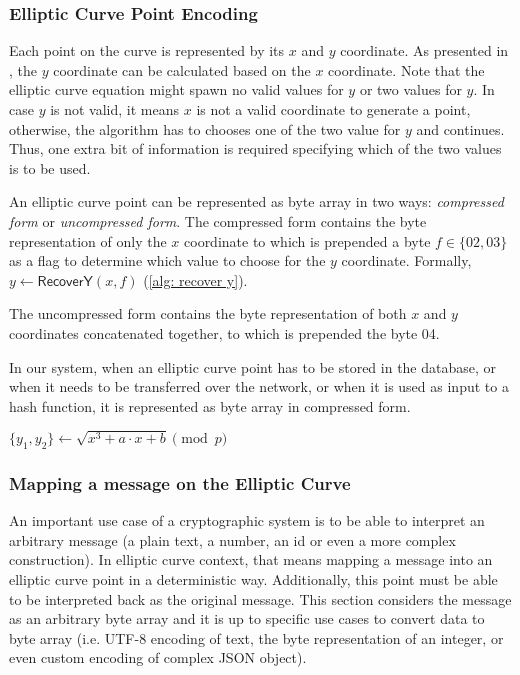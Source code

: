 \subsubsection{Elliptic Curve Point Encoding}
Each point on the curve is represented by its $x$ and $y$ coordinate. As presented in \cite{Trappe05}, the $y$ coordinate can be calculated based on the $x$ coordinate. Note that the elliptic curve equation might spawn no valid values for $y$ or two values for $y$. In case $y$ is not valid, it means $x$ is not a valid coordinate to generate a point, otherwise, the algorithm has to chooses one of the two value for $y$ and continues. Thus, one extra bit of information is required specifying which of the two values is to be used.

An elliptic curve point can be represented as byte array in two ways: \textit{compressed form} or \textit{uncompressed form}. The compressed form contains the byte representation of only the $x$ coordinate to which is prepended a byte $f \in \{ 02, 03 \}$ as a flag to determine which value to choose for the $y$ coordinate. Formally, $y \gets \mathsf{RecoverY}(x, f)$ (\cref{alg: recover y}).

The uncompressed form contains the byte representation of both $x$ and $y$ coordinates concatenated together, to which is prepended the byte 04.

In our system, when an elliptic curve point has to be stored in the database, or when it needs to be transferred over the network, or when it is used as input to a hash function, it is represented as byte array in compressed form.

\begin{algorithm}[ht]
\DontPrintSemicolon
    \caption{\( \mathsf{RecoverY} (x, f) \)}
    \label{alg: recover y}
    \( \{ y_1, y_2 \} \gets \sqrt{x^3 + a \cdot x + b} \pmod p \) \;
     
\end{algorithm}


\subsubsection{Mapping a message on the Elliptic Curve} \label{app: mapping a message on the elliptic curve}
An important use case of a cryptographic system is to be able to interpret an arbitrary message (a plain text, a number, an id or even a more complex construction). In elliptic curve context, that means mapping a message into an elliptic curve point in a deterministic way. Additionally, this point must be able to be interpreted back as the original message. This section considers the message as an arbitrary byte array and it is up to specific use cases to convert data to byte array (i.e. UTF-8 encoding of text, the byte representation of an integer, or even custom encoding of complex JSON object).

